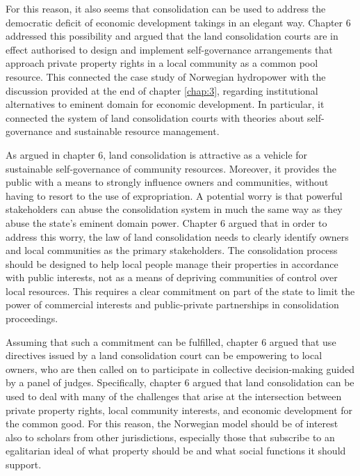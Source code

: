 For this reason, it also seems that consolidation can be used to address the democratic deficit of economic development takings in an elegant way. Chapter 6 addressed this possibility and argued that the land consolidation courts are in effect authorised to design and implement self-governance arrangements that approach private property rights in a local community as a common pool resource. This connected the case study of Norwegian hydropower with the discussion provided at the end of chapter \ref{chap:3}, regarding institutional alternatives to eminent domain for economic development. In particular, it connected the system of land consolidation courts with theories about self-governance and sustainable resource management.

As argued in chapter 6, land consolidation is attractive as a vehicle for sustainable self-governance of community resources. Moreover, it provides the public with a means to strongly influence owners and communities, without having to resort to the use of expropriation. A potential worry is that powerful stakeholders can abuse the consolidation system in much the same way as they abuse the state's eminent domain power. Chapter 6 argued that in order to address this worry, the law of land consolidation needs to clearly identify owners and local communities as the primary stakeholders. The consolidation process should be designed to help local people manage their properties in accordance with public interests, not as a means of depriving communities of control over local resources. This requires a clear commitment on part of the state to limit the power of commercial interests and public-private partnerships in consolidation proceedings.

Assuming that such a commitment can be fulfilled, chapter 6 argued that use directives issued by a land consolidation court can be empowering to local owners, who are then called on to participate in collective decision-making guided by a panel of judges. Specifically, chapter 6 argued that land consolidation can be used to deal with many of the challenges that arise at the intersection between private property rights, local community interests, and economic development for the common good. For this reason, the Norwegian model should be of interest also to scholars from other jurisdictions, especially those that subscribe to an egalitarian ideal of what property should be and what social functions it should support.

